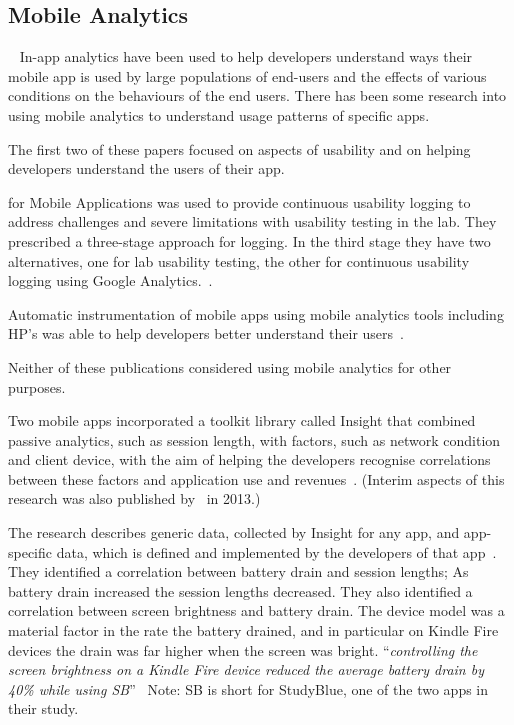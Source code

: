 \subsection{Mobile Analytics}~\label{rw-mobile-analytics-topic}
In-app analytics have been used to help developers understand ways their mobile app is used by large populations of end-users and the effects of various conditions on the behaviours of the end users. There has been some research into using mobile analytics to understand usage patterns of specific apps.

The first two of these papers focused on aspects of usability and on helping developers understand the users  of their app.

 for Mobile Applications was used to provide continuous usability logging to address challenges and severe limitations with usability testing in the lab. They prescribed a three-stage approach for logging. In the third stage they have two alternatives, one for lab usability testing, the other for continuous usability logging using Google Analytics.~.

Automatic instrumentation of mobile apps using mobile analytics tools including HP's  was able to help developers better understand their users~.

Neither of these publications considered using mobile analytics for other purposes.

Two mobile apps incorporated a toolkit library called Insight that combined passive analytics, such as session length, with factors, such as network condition and client device, with the aim of helping the developers recognise correlations between these factors and application use and revenues~. (Interim aspects of this research was also published by~ in 2013.)

The research describes generic data, collected by Insight for any app, and app-specific data, which is defined and implemented by the developers of that app~. They identified a correlation between battery drain and session lengths; As battery drain increased the session lengths decreased. They also identified a correlation between screen brightness and battery drain. The device model was a material factor in the rate the battery drained, and in particular on Kindle Fire devices the drain was far higher when the screen was bright. ``\emph{controlling the screen brightness on a Kindle Fire device reduced the average battery drain by 40\% while using SB}''~ Note: SB is short for StudyBlue, one of the two apps in their study.

